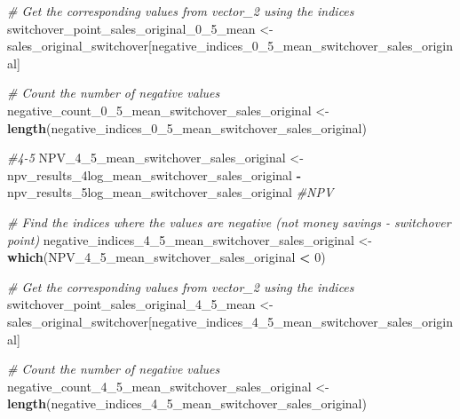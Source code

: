 \documentclass[
]{article}
\newenvironment{Shaded}{\begin{snugshade}}{\end{snugshade}}
\newcommand{\CommentTok}[1]{\textcolor[rgb]{0.56,0.35,0.01}{\textit{#1}}}
\newcommand{\DecValTok}[1]{\textcolor[rgb]{0.00,0.00,0.81}{#1}}
\newcommand{\FunctionTok}[1]{\textcolor[rgb]{0.13,0.29,0.53}{\textbf{#1}}}
\newcommand{\NormalTok}[1]{#1}
\newcommand{\OtherTok}[1]{\textcolor[rgb]{0.56,0.35,0.01}{#1}}
\newcommand{\SpecialCharTok}[1]{\textcolor[rgb]{0.81,0.36,0.00}{\textbf{#1}}}
\begin{document}
\begin{Shaded}
\begin{Highlighting}[]
\CommentTok{\# Get the corresponding values from vector\_2 using the indices}
\NormalTok{switchover\_point\_sales\_original\_0\_5\_mean }\OtherTok{\textless{}{-}}\NormalTok{ sales\_original\_switchover[negative\_indices\_0\_5\_mean\_switchover\_sales\_original]}

\CommentTok{\# Count the number of negative values}
\NormalTok{negative\_count\_0\_5\_mean\_switchover\_sales\_original }\OtherTok{\textless{}{-}} \FunctionTok{length}\NormalTok{(negative\_indices\_0\_5\_mean\_switchover\_sales\_original)}


\CommentTok{\#4{-}5}
\NormalTok{NPV\_4\_5\_mean\_switchover\_sales\_original }\OtherTok{\textless{}{-}}\NormalTok{ npv\_results\_4log\_mean\_switchover\_sales\_original }\SpecialCharTok{{-}}\NormalTok{ npv\_results\_5log\_mean\_switchover\_sales\_original }\CommentTok{\#NPV}

\CommentTok{\# Find the indices where the values are negative (not money savings {-} switchover point)}
\NormalTok{negative\_indices\_4\_5\_mean\_switchover\_sales\_original }\OtherTok{\textless{}{-}} \FunctionTok{which}\NormalTok{(NPV\_4\_5\_mean\_switchover\_sales\_original }\SpecialCharTok{\textless{}} \DecValTok{0}\NormalTok{)}

\CommentTok{\# Get the corresponding values from vector\_2 using the indices}
\NormalTok{switchover\_point\_sales\_original\_4\_5\_mean }\OtherTok{\textless{}{-}}\NormalTok{ sales\_original\_switchover[negative\_indices\_4\_5\_mean\_switchover\_sales\_original]}

\CommentTok{\# Count the number of negative values}
\NormalTok{negative\_count\_4\_5\_mean\_switchover\_sales\_original }\OtherTok{\textless{}{-}} \FunctionTok{length}\NormalTok{(negative\_indices\_4\_5\_mean\_switchover\_sales\_original)}
\end{Highlighting}
\end{Shaded}
\end{document}
